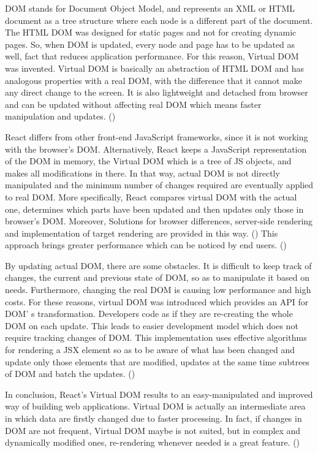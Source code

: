 DOM stands for Document Object Model, and represents an XML or HTML document as a tree structure where each node is a different part of the document. The HTML DOM was designed for static pages and not for creating dynamic pages. So, when DOM is updated, every node and page has to be updated as well, fact that reduces application performance. For this reason, Virtual DOM was invented. Virtual DOM is basically an abstraction of HTML DOM and has analogous properties with a real DOM, with the difference that it cannot make any direct change to the screen. It is also lightweight and detached from browser and can be updated without affecting real DOM which means faster manipulation and updates. (\cite{Reference12}) \par

React differs from other front-end JavaScript frameworks, since it is not working with the browser's DOM. Alternatively, React keeps a JavaScript representation of the DOM in memory, the Virtual DOM which is a tree of JS objects, and makes all modifications in there. In that way, actual DOM is not directly manipulated and the minimum number of changes required are eventually applied to real DOM. More specifically, React compares virtual DOM with the actual one, determines which parts have been updated and then updates only those in browser's DOM. Moreover, Solutions for browser differences, server-side rendering and implementation of target rendering are provided in this way. (\cite{Reference10}) This approach brings greater performance which can be noticed by end users. (\cite{Reference13}) \par

By updating actual DOM, there are some obstacles. It is difficult to keep track of changes, the current and previous state of DOM, so as to manipulate it based on needs. Furthermore, changing the real DOM is causing low performance and high costs. For these reasons, virtual DOM was introduced which provides an API for DOM' s transformation. Developers code as if they are re-creating the whole DOM on each update. This leads to easier development model which does not require tracking changes of DOM. This implementation uses effective algorithms for rendering a JSX element so as to be aware of what has been changed and update only those elements that are modified, updates at the same time subtrees of DOM and batch the updates. (\cite{Reference10}) \par

In conclusion, React's Virtual DOM results to an easy-manipulated and improved way of building web applications. Virtual DOM is actually an intermediate area in which data are firstly changed due to faster processing. In fact, if changes in DOM are not frequent, Virtual DOM maybe is not suited, but in complex and dynamically modified ones, re-rendering whenever needed is a great feature. (\cite{Reference13}) \par

